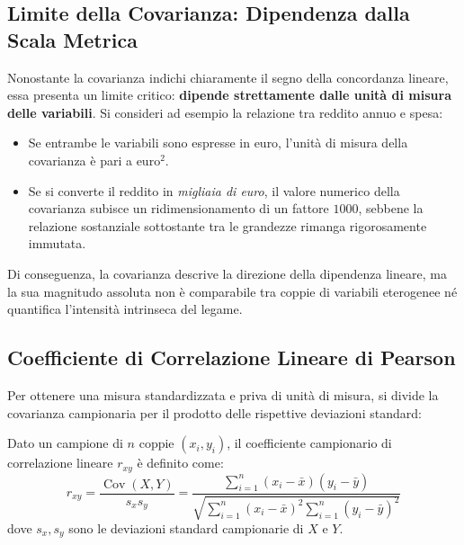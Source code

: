 \subsection{Limite della Covarianza: Dipendenza dalla Scala Metrica}
Nonostante la covarianza indichi chiaramente il segno della concordanza lineare, essa presenta un limite critico: \textbf{dipende strettamente dalle unit\`a di misura delle variabili}.
Si consideri ad esempio la relazione tra reddito annuo e spesa:
\begin{itemize}
    \item Se entrambe le variabili sono espresse in euro, l'unit\`a di misura della covarianza \`e pari a $\text{euro}^2$.
    \item Se si converte il reddito in \textit{migliaia di euro}, il valore numerico della covarianza subisce un ridimensionamento di un fattore $1000$, sebbene la relazione sostanziale sottostante tra le grandezze rimanga rigorosamente immutata.
\end{itemize}
Di conseguenza, la covarianza descrive la direzione della dipendenza lineare, ma la sua magnitudo assoluta non \`e comparabile tra coppie di variabili eterogenee n\'e quantifica l'intensit\`a intrinseca del legame.

\subsection{Coefficiente di Correlazione Lineare di Pearson}
Per ottenere una misura standardizzata e priva di unit\`a di misura, si divide la covarianza campionaria per il prodotto delle rispettive deviazioni standard:

\begin{definition}
Dato un campione di $n$ coppie $(x_i, y_i)$, il coefficiente campionario di correlazione lineare $r_{xy}$ \`e definito come:
\begin{equation}
r_{xy} = \frac{\operatorname{Cov}(X, Y)}{s_x s_y} = \frac{\sum_{i=1}^n (x_i - \bar{x})(y_i - \bar{y})}{\sqrt{\sum_{i=1}^n (x_i - \bar{x})^2 \sum_{i=1}^n (y_i - \bar{y})^2}}
\end{equation}
dove $s_x, s_y$ sono le deviazioni standard campionarie di $X$ e $Y$.
\end{definition}

